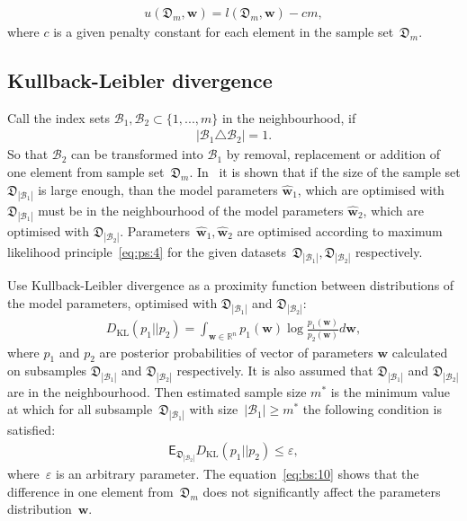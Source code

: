 \documentclass[
11pt,%
tightenlines,%
twoside,%
onecolumn,%
nofloats,%
nobibnotes,%
nofootinbib,%
superscriptaddress,%
noshowpacs,%
centertags]%
{revtex4}
\begin{document}
\[
\label{eq:bs:7}
\begin{aligned}
	u\left(\mathfrak{D}_m, \textbf{w}\right) = l\left(\mathfrak{D}_m, \textbf{w}\right) - cm,
\end{aligned}
\]
 where $c$  is a given penalty constant for each element in the sample set~$\mathfrak{D}_m$.  
	 
\subsection{Kullback-Leibler divergence}
Call the index  sets $\mathcal{B}_1,\mathcal{B}_2 \subset \{1,...,m\}$ in the neighbourhood, if
\[
\label{eq:bs:8}
\begin{aligned}
	\left|\mathcal{B}_1 \triangle \mathcal{B}_2\right| = 1.
\end{aligned}
\]
So that $\mathcal{B}_2$ can be transformed into $\mathcal{B}_1$ by removal, replacement or addition of one element from sample set~$\mathfrak{D}_m$. In~\cite{motrenko2014} it is shown that if the size of the sample set $\mathfrak{D}_{|\mathcal{B}_1|}$ is large enough, than the model  parameters $\hat{\textbf{w}}_1$, which  are optimised with $\mathfrak{D}_{|\mathcal{B}_1|}$ must be in the neighbourhood of the model parameters $\hat{\textbf{w}}_2$, which are optimised with $\mathfrak{D}_{|\mathcal{B}_2|}$. Parameters~$\hat{\textbf{w}}_1, \hat{\textbf{w}}_2$ are optimised according to maximum likelihood principle~\eqref{eq:ps:4} for the given datasets~$\mathfrak{D}_{|\mathcal{B}_1|}, \mathfrak{D}_{|\mathcal{B}_2|}$ respectively.
	 
Use Kullback-Leibler divergence as a proximity function between distributions of the model parameters, optimised with $\mathfrak{D}_{|\mathcal{B}_1|}$ and $\mathfrak{D}_{|\mathcal{B}_2|}$:
\[
\label{eq:bs:9}
\begin{aligned}
	D_\text{KL}\left(p_1 || p_2\right) = \int_{\textbf{w}\in\mathbb{R}^{n}}p_1(\textbf{w})\log\frac{p_1(\textbf{w})}{p_2(\textbf{w})}d\textbf{w},
\end{aligned}
\]
where $p_1$ and $p_2$ are posterior probabilities of vector of parameters $\textbf{w}$ calculated on subsamples $\mathfrak{D}_{|\mathcal{B}_1|}$ and $\mathfrak{D}_{|\mathcal{B}_2|}$ respectively. It is also assumed that $\mathfrak{D}_{|\mathcal{B}_1|}$ and $\mathfrak{D}_{|\mathcal{B}_2|}$ are in the neighbourhood.
Then estimated sample size $m^*$ is the minimum value at which for all subsample~$\mathfrak{D}_{|\mathcal{B}_1|}$ with size~$|\mathcal{B}_1|\geq m^*$ the following condition is satisfied:
\[
\label{eq:bs:10}
\begin{aligned}
	\mathsf{E}_{\mathfrak{D}_{|\mathcal{B}_2|}}D_\text{KL}\left(p_1 || p_2\right) \leq \varepsilon,
\end{aligned}
\]
where~$\varepsilon$ is an arbitrary parameter. The equation~\eqref{eq:bs:10} shows that the difference in one element from~$\mathfrak{D}_m$ does not significantly affect the parameters distribution~$\mathbf{w}$. 
\end{document}
